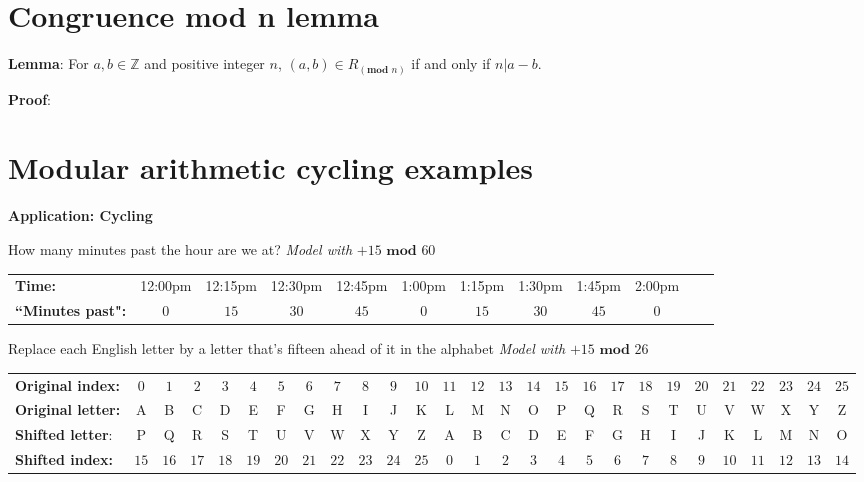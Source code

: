 \documentclass[12pt, oneside]{article}
\begin{document}
\section*{Congruence mod n lemma}


{\bf Lemma}: For $a, b \in \mathbb{Z}$ 
and positive integer $n$, $(a,b) \in R_{(\textbf{mod } n)}$ if and only if  $n | a-b$.

{\bf Proof}: 

\phantom{Consider arbitrary integers $a,b$ and arbitrary positive integer $n$.}



\vspace{200pt} \vfill
\section*{Modular arithmetic cycling examples}


{\bf Application: Cycling}

How many minutes past the hour are we at?  \hfill {\it Model with} $+15 \textbf{ mod } 60$

\begin{tabular}{lccccccccccc}
{\bf Time:} &12:00pm  &12:15pm&12:30pm  &12:45pm&1:00pm  &1:15pm&1:30pm  &1:45pm&2:00pm \\
{\bf ``Minutes past":} &$0$ & $15$ & $30$ & $45$ &$0$ & $15$ & $30$ & $45$ &$0$\\
\end{tabular}

\vspace{50pt}

Replace each English letter by a letter that's fifteen ahead of it in the alphabet
  \hfill {\it Model with} $+15 \textbf{ mod } 26$

{\tiny
\begin{tabular}{lcccccccccccccccccccccccccc}
{\bf Original index:} & $0$ & $1$
 & $2$ & $3$ &  $4$ & $5$ &  $6$ & $7$ &  $8$ & $9$ & $10$ & $11$ & $12$ & $13$ & $14$ & $15$ & 
  $16$ & $17$ &  $18$ & $19$ &  $20$ & $21$ &  $22$ & $23$ & $24$ & $25$\\
{\bf Original letter:} & A & B& C & D & E & F& G& H & I & J & K & L &M & N& O &P &Q & R & S & T & U & V & W & X & Y & Z \\
{\bf Shifted letter}: &P &Q & R & S & T & U & V & W & X & Y & Z & A & B& C & D & E & F& G& H & I & J & K & L &M & N& O \\
{\bf Shifted index:} &$15$ & 
  $16$ & $17$ &  $18$ & $19$ &  $20$ & $21$ &  $22$ & $23$ & $24$ & $25$ & $0$ & $1$
 & $2$ & $3$ &  $4$ & $5$ &  $6$ & $7$ &  $8$ & $9$ & $10$ & $11$ & $12$ & $13$ & $14$ 
\end{tabular}
} \vfill
\end{document}
